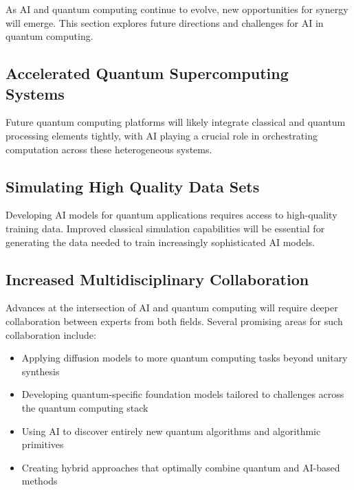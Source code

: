 As AI and quantum computing continue to evolve, new opportunities for synergy will emerge. This section explores future directions and challenges for AI in quantum computing.

\subsection{Accelerated Quantum Supercomputing Systems}
Future quantum computing platforms will likely integrate classical and quantum processing elements tightly, with AI playing a crucial role in orchestrating computation across these heterogeneous systems.

\subsection{Simulating High Quality Data Sets}
Developing AI models for quantum applications requires access to high-quality training data. Improved classical simulation capabilities will be essential for generating the data needed to train increasingly sophisticated AI models.

\subsection{Increased Multidisciplinary Collaboration}
Advances at the intersection of AI and quantum computing will require deeper collaboration between experts from both fields. Several promising areas for such collaboration include:

\begin{itemize}
    \item Applying diffusion models to more quantum computing tasks beyond unitary synthesis
    \item Developing quantum-specific foundation models tailored to challenges across the quantum computing stack
    \item Using AI to discover entirely new quantum algorithms and algorithmic primitives
    \item Creating hybrid approaches that optimally combine quantum and AI-based methods
\end{itemize} 
